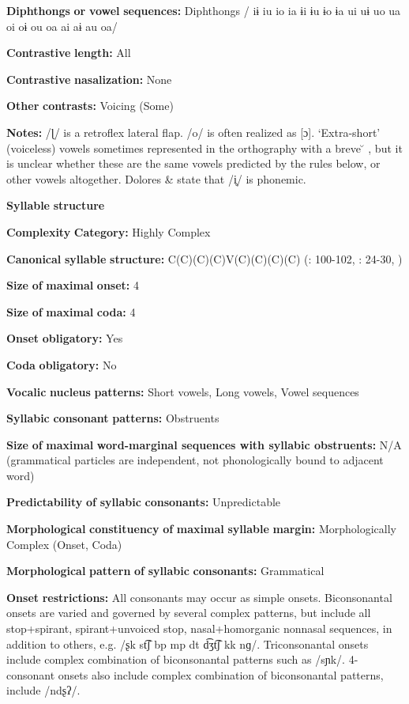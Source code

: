 \begin{styleBody}
\textbf{Diphthongs} \textbf{or} \textbf{vowel} \textbf{sequences:} Diphthongs / iɨ iu io ia ɨi ɨu ɨo ɨa ui uɨ uo ua oi oɨ ou oa ai aɨ au oa/

\textbf{Contrastive} \textbf{length:} All

\textbf{Contrastive} \textbf{nasalization:} None

\textbf{Other} \textbf{contrasts:} Voicing (Some)

\textbf{Notes:} /ɭ/ is a retroflex lateral flap. /o/ is often realized as [ɔ]. ‘Extra-short’ (voiceless) vowels sometimes represented in the orthography with a breve  \u{} , but it is unclear whether these are the same vowels predicted by the rules below, or other vowels altogether. Dolores \& \citet[236]{Mathiot1991} state that /i̥/ is phonemic.

\textbf{Syllable} \textbf{structure}

\textbf{Complexity} \textbf{Category:} Highly Complex

\textbf{Canonical} \textbf{syllable} \textbf{structure:} C(C)(C)(C)V(C)(C)(C)(C) (\citealt{Saxton1982}: 100-102, \citealt{Hale1959}: 24-30, \citealt{HillZepeda1992})

\textbf{Size} \textbf{of} \textbf{maximal} \textbf{onset:} 4

\textbf{Size} \textbf{of} \textbf{maximal} \textbf{coda:} 4

\textbf{Onset} \textbf{obligatory:} Yes

\textbf{Coda} \textbf{obligatory:} No

\textbf{Vocalic} \textbf{nucleus} \textbf{patterns:} Short vowels, Long vowels, Vowel sequences

\textbf{Syllabic} \textbf{consonant} \textbf{patterns:} Obstruents

\textbf{Size} \textbf{of} \textbf{maximal} \textbf{word{}-marginal sequences with syllabic obstruents:} N/A (grammatical particles are independent, not phonologically bound to adjacent word)

\textbf{Predictability} \textbf{of} \textbf{syllabic} \textbf{consonants:} Unpredictable

\textbf{Morphological} \textbf{constituency} \textbf{of} \textbf{maximal} \textbf{syllable} \textbf{margin:} Morphologically Complex (Onset, Coda)

\textbf{Morphological} \textbf{pattern} \textbf{of} \textbf{syllabic} \textbf{consonants:} Grammatical

\textbf{Onset} \textbf{restrictions:} All consonants may occur as simple onsets. Biconsonantal onsets are varied and governed by several complex patterns, but include all stop+spirant, spirant+unvoiced stop, nasal+homorganic nonnasal sequences, in addition to others, e.g. /ʂk st͡ʃ bp mp dt d͡ʒt͡ʃ kk nɡ/. Triconsonantal onsets include complex combination of biconsonantal patterns such as /sɲk/. 4-consonant onsets also include complex combination of biconsonantal patterns, include /ndʂʔ/.


\end{styleBody}
